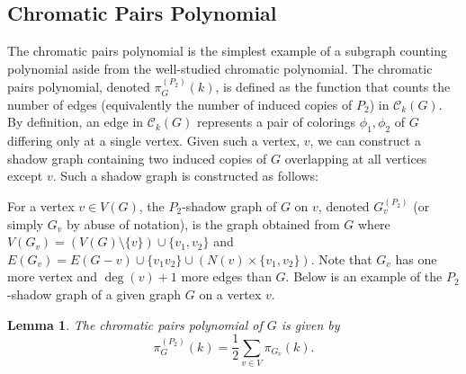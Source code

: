 \documentclass[12pt,reqno,dvipsnames]{amsart}
\newtheorem{lemma}[theorem]{Lemma}
\theoremstyle{definition}
\begin{document}
\subsection{Chromatic Pairs Polynomial}
The chromatic pairs polynomial is the simplest example of a subgraph counting polynomial aside from the well-studied chromatic polynomial. The chromatic pairs polynomial, denoted $\pi_G^{(P_2)}(k)$, is defined as the function that counts the number of edges (equivalently the number of induced copies of $P_2$) in $\mathcal{C}_k(G)$. By definition, an edge in $\mathcal{C}_k(G)$ represents a pair of colorings $\phi_1,\phi_2$ of $G$ differing only at a single vertex. Given such a vertex, $v$, we can construct a shadow graph containing two induced copies of $G$ overlapping at all vertices except $v$. Such a shadow graph is constructed as follows:

For a vertex $v \in V(G)$, the $P_2$-shadow graph of $G$ on $v$, denoted $G_v^{(P_2)}$ (or simply $G_v$ by abuse of notation), is the graph obtained from $G$ where $V(G_v) = (V(G) \setminus \{v\}) \cup \{v_1, v_2\}$ and 
$E(G_v) = E(G - v) \cup \{v_1v_2\} \cup (N(v)\times\{v_1,v_2\})$.
Note that $G_{v}$ has one more vertex and $\deg(v)+1$ more edges than $G$.
Below is an example of the $P_2$-shadow graph of a given graph $G$ on a vertex $v$.
\begin{figure}[ht]
	\centering
\end{figure}
\begin{lemma}\label{lem:pairs}
The chromatic pairs polynomial of $G$ is given by
$$
\pi_G^{(P_2)}(k) = \frac{1}{2} \sum_{v \in V} \pi_{G_v}(k).
$$
\end{lemma}
\end{document}
